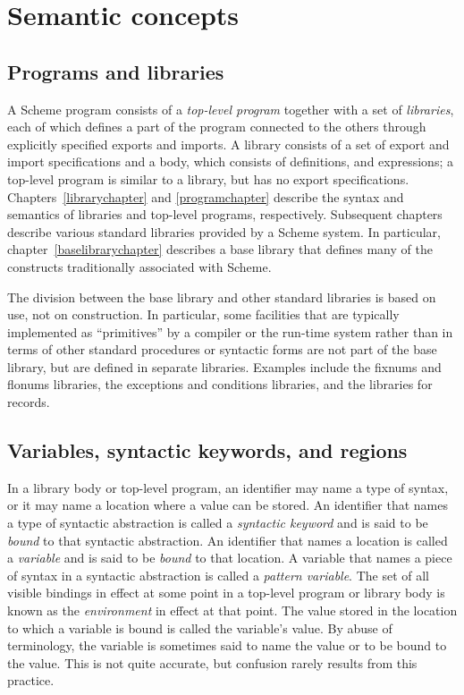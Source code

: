 \chapter{Semantic concepts}
\label{basicchapter}

\section{Programs and libraries}

A Scheme program consists of a \textit{top-level program}
together with a set of \textit{libraries}, each
of which defines a part of the program connected to the others through
explicitly specified exports and imports.  A library consists of a set
of export and import specifications and a body, which consists of
definitions, and expressions;
a top-level program is similar to a library, but
has no export specifications.
Chapters~\ref{librarychapter} and \ref{programchapter}
describe the syntax and semantics of libraries and top-level programs,
respectively.  Subsequent chapters
describe various standard libraries provided by a Scheme system.  In
particular, chapter~\ref{baselibrarychapter} describes a base
library that defines many of the constructs traditionally associated with
Scheme.

The division between the base library and other standard libraries is
based on use, not on construction.  In particular, some facilities
that are typically implemented as ``primitives'' by a compiler or the
run-time system rather than in terms of other standard procedures
 or syntactic forms are not part of the base library, but are defined in
separate libraries.  Examples include the fixnums and flonums libraries,
the exceptions and conditions libraries, and the libraries for
records.

\section{Variables, syntactic keywords, and regions}
\label{specialformsection}
\label{variablesection}

In a library body or top-level program,
an identifier may name a type of syntax, or it may name
a location where a value can be stored.  An identifier that names a type
of syntactic abstraction is called a {\em syntactic keyword}
and is said to be {\em bound} to that syntactic abstraction.  An identifier that names a
location is called a {\em variable} and is said to be
{\em bound} to that location.  
A variable that names a piece of syntax in a syntactic abstraction is
called a \textit{pattern variable}.
The set of all visible
bindings in effect at some point in a top-level program or
library body is
known as the {\em environment} in effect at that point.  The value
stored in the location to which a variable is bound is called the
variable's value.  By abuse of terminology, the variable is sometimes
said to name the value or to be bound to the value.  This is not quite
accurate, but confusion rarely results from this practice.

